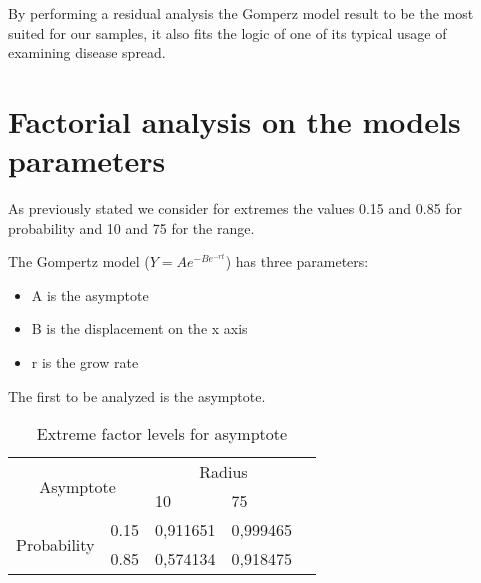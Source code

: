 By performing a residual analysis the Gomperz model result to be the most suited for our samples, it also fits the logic of one of its typical usage of examining disease spread.

\section{Factorial analysis on the models parameters}
As previously stated we consider for extremes the values 0.15 and 0.85 for probability and 10 and 75 for the range.

The Gompertz model ($ Y = Ae^{-Be^{-rt}} $) has three parameters:
\begin{itemize}
	\item A is the asymptote
	\item B is the displacement on the x axis
	\item r is the grow rate
\end{itemize}
The first to be analyzed is the asymptote.


\begin{table}[H]
\centering
\begin{tabular}{|cl|ll|l}
\cline{1-4}
\multicolumn{2}{|c|}{\multirow{2}{*}{Asymptote}}        & \multicolumn{2}{c|}{Radius}              &  \\ \cline{3-4}
\multicolumn{2}{|c|}{}                                  & \multicolumn{1}{l|}{10}       & 75       &  \\ \cline{1-4}
\multicolumn{1}{|c|}{\multirow{2}{*}{Probability}} & 0.15 & \multicolumn{1}{l|}{0,911651} & 0,999465 &  \\ \cline{2-4}
\multicolumn{1}{|c|}{}                             & 0.85 & \multicolumn{1}{l|}{0,574134} & 0,918475 &  \\ \cline{1-4}
\end{tabular}
\caption{Extreme factor levels for asymptote}
\end{table}


